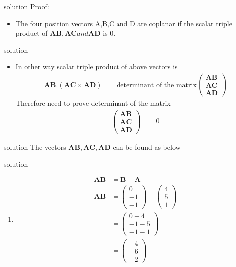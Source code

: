 \documentclass{beamer}
\let\vec\mathbf
\newcommand{\myvec}[1]{\ensuremath{\begin{pmatrix}#1\end{pmatrix}}}
\begin{document}
 
 \begin{frame}{solution}
 Proof:
 \begin{itemize}
 \item The four position vectors A,B,C and D are coplanar if the scalar triple product of $\vec{AB},\vec{AC} and \vec{AD}$ is $0.$
\end{itemize}
\end{frame}


\begin{frame}{solution}
\begin{itemize}
\item In other way scalar triple product of above vectors is 
\begin{align}
      \vec{AB}.(\vec{AC} \times \vec{AD}) & = \text{determinant of the matrix} \myvec{\vec{AB}\\\vec{AC}\\\vec{AD}}
      \end{align}
Therefore need to prove determinant of the matrix
\begin{align}
    \myvec{\vec{AB}\\\vec{AC}\\\vec{AD}} & = 0
\end{align}
\end{itemize}
 \end{frame}
 
 
 \begin{frame}{solution}
 The vectors $\vec{AB},\vec{AC},\vec{AD}$ can be found as below
 \end{frame}
 
 
 \begin{frame}{solution}
 \begin{enumerate}
 \item 
 \begin{align}
     \vec{AB} & = \vec{B}-\vec{A}\\
     \vec{AB} & = \myvec{0\\-1\\-1}-\myvec{4\\5\\1}\nonumber\\
              & = \myvec{0-4\\ -1-5\\-1-1}\nonumber\\
              & = \myvec{-4\\-6\\-2}
\end{align}
\end{enumerate}
\end{frame}
 
\end{document}

